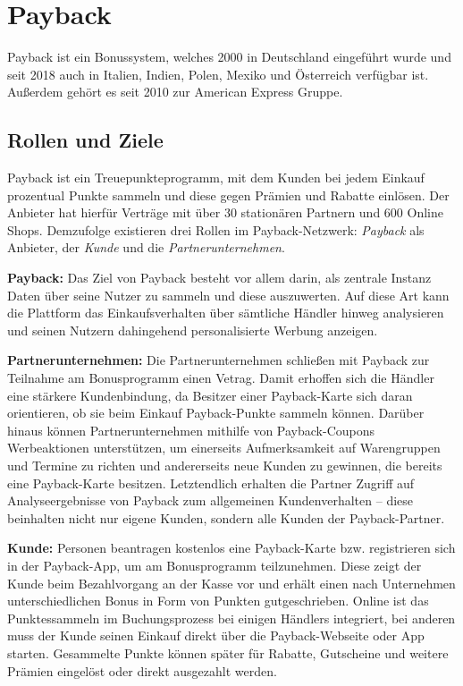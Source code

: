 \section{Payback} \label{Payback}
Payback ist ein Bonussystem, welches 2000 in Deutschland eingeführt wurde und seit 2018 auch in Italien, Indien, Polen, Mexiko und Österreich verfügbar ist. Außerdem gehört es seit 2010 zur American Express Gruppe. \cite{Payback_Info}

\subsection{Rollen und Ziele}
Payback ist ein Treuepunkteprogramm, mit dem Kunden bei jedem Einkauf prozentual Punkte sammeln und diese gegen Prämien und Rabatte einlösen. Der Anbieter hat hierfür Verträge mit über 30 stationären Partnern und 600 Online Shops. \cite{Payback} Demzufolge existieren drei Rollen im Payback-Netzwerk: \textit{Payback} als Anbieter, der \textit{Kunde} und die \textit{Partnerunternehmen}. \newline

\noindent \textbf{Payback:} Das Ziel von Payback besteht vor allem darin, als zentrale Instanz Daten über seine Nutzer zu sammeln und diese auszuwerten. Auf diese Art kann die Plattform das Einkaufsverhalten über sämtliche Händler hinweg analysieren und seinen Nutzern dahingehend personalisierte Werbung anzeigen. \newline

\noindent \textbf{Partnerunternehmen:} Die Partnerunternehmen schließen mit Payback zur Teilnahme am Bonusprogramm einen Vetrag. Damit erhoffen sich die Händler eine stärkere Kundenbindung, da Besitzer einer Payback-Karte sich daran orientieren, ob sie beim Einkauf Payback-Punkte sammeln können. Darüber hinaus können Partnerunternehmen mithilfe von Payback-Coupons Werbeaktionen unterstützen, um einerseits Aufmerksamkeit auf Warengruppen und Termine zu richten und andererseits neue Kunden zu gewinnen, die bereits eine Payback-Karte besitzen. Letztendlich erhalten die Partner Zugriff auf Analyseergebnisse von Payback zum allgemeinen Kundenverhalten -- diese beinhalten nicht nur eigene Kunden, sondern alle Kunden der Payback-Partner. \newline

\noindent \textbf{Kunde:} Personen beantragen kostenlos eine Payback-Karte bzw. registrieren sich in der Payback-App, um am Bonusprogramm teilzunehmen. Diese zeigt der Kunde beim Bezahlvorgang an der Kasse vor und erhält einen nach Unternehmen unterschiedlichen Bonus in Form von Punkten gutgeschrieben. Online ist das Punktessammeln im Buchungsprozess bei einigen Händlers integriert, bei anderen muss der Kunde seinen Einkauf direkt über die Payback-Webseite oder App starten. Gesammelte Punkte können später für Rabatte, Gutscheine und weitere Prämien eingelöst oder direkt ausgezahlt werden.

